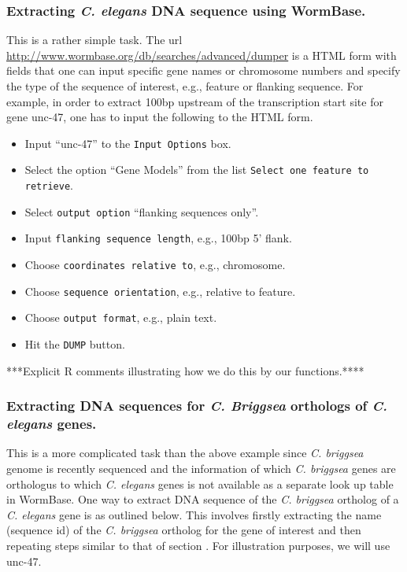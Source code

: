 \documentclass[notitlepage,11pt]{article}
\begin{document}
\subsubsection{Extracting  \textit{C. elegans} 
DNA sequence using WormBase.} \label{wormbase.eg1}

This is a rather simple task. The url 
\url{http://www.wormbase.org/db/searches/advanced/dumper} is a
HTML form with fields that one can input specific gene names or
chromosome numbers and specify the type of the sequence of interest,
e.g., feature or flanking sequence. For example, in order to extract 100bp
upstream of the transcription start site for gene unc-47, one has to
input the following to the HTML form.

\begin{itemize}
\item Input ``unc-47'' to the \texttt{Input Options} box.
\item Select the option ``Gene Models'' from the list \texttt{Select one
  feature to retrieve}.
\item Select \texttt{output option} ``flanking sequences only''.
\item Input \texttt{flanking sequence length}, e.g., 100bp 5' flank.
\item Choose \texttt{coordinates relative to}, e.g., chromosome.
\item Choose \texttt{sequence orientation}, e.g., relative to feature.
\item Choose \texttt{output format}, e.g., plain text.
\item Hit the  \texttt{DUMP} button.
\end{itemize}


***Explicit R comments illustrating how we do this by our functions.****

\subsubsection{Extracting DNA sequences for \textit{C. Briggsea} orthologs of
  \textit{C. elegans} genes.} \label{wormbase.eg2}
 This is a more complicated task than the 
  above example  since \textit{C. briggsea} genome is recently sequenced 
\citep{CBgenome} and the information of which  \textit{C. briggsea} genes are
  orthologus to which \textit{C. elegans} genes is not available as 
  a separate look up table in WormBase. One way to extract DNA sequence of the 
  \textit{C. briggsea} ortholog of a \textit{C. elegans} gene is as
  outlined below. This involves firstly extracting the name (sequence id) of the \textit{C. briggsea} ortholog for the gene of interest and then repeating 
steps similar to that of section \label{wormbase.eg1}. 
For illustration purposes, we will use unc-47.
\end{document}
